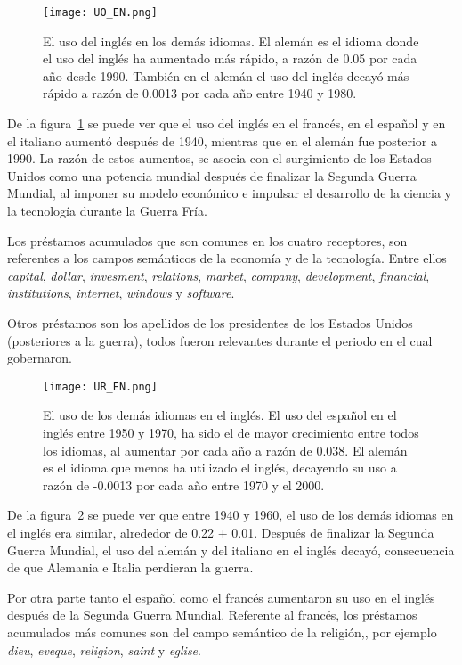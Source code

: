 \begin{figure}[h!]
	\centering
	\texttt{[image: UO\_EN.png]}
	\caption{El uso del inglés en los demás idiomas. El alemán es el idioma donde el uso del inglés ha aumentado más rápido, a razón de  0.05 por cada año desde 1990. También en el alemán el uso del inglés decayó más rápido a razón de 0.0013 por cada año entre 1940 y 1980.}
	\label{fig.UO_EN}
\end{figure} 


De la figura~\ref{fig.UO_EN} se puede ver que el uso del inglés en el francés, en el español y en el italiano aumentó después de 1940, mientras que en el alemán fue posterior a 1990.  La razón de estos aumentos, se asocia con el surgimiento de los Estados Unidos como una potencia mundial después de finalizar la Segunda Guerra Mundial,  al  imponer  su modelo económico e impulsar el desarrollo de la ciencia y la tecnología durante la Guerra Fría.

Los préstamos acumulados  que son comunes en los cuatro receptores, son referentes a los campos semánticos de la economía y de la tecnología. Entre ellos \textit{capital}, \textit{dollar}, \textit{invesment}, \textit{relations}, \textit{market}, \textit{company}, \textit{development}, \textit{financial},  \textit{institutions}, \textit{internet}, \textit{windows} y \textit{software}. 

Otros préstamos son los apellidos de los presidentes de los Estados Unidos (posteriores a la guerra), todos fueron relevantes durante el periodo en el cual gobernaron. 


\begin{figure}[h!]
	\centering
	\texttt{[image: UR\_EN.png]}
	\caption{El uso de los demás idiomas en el inglés. El uso del español en el inglés entre 1950 y 1970, ha sido el de mayor crecimiento entre todos los idiomas, al aumentar por cada año a razón de 0.038.  El alemán es el idioma que menos ha utilizado el inglés, decayendo su uso a razón de -0.0013 por cada año entre 1970 y el 2000.}
	\label{fig.UR_EN}
\end{figure} 


De la figura~\ref{fig.UR_EN} se puede ver que entre 1940 y 1960, el uso de los demás idiomas en el inglés era similar, alrededor de 0.22 $\pm$ 0.01. Después de finalizar la Segunda Guerra Mundial, el uso del alemán y del italiano en el inglés decayó,  consecuencia de que Alemania e Italia perdieran la guerra.

Por otra parte tanto el español como el francés aumentaron su uso en el inglés después de la Segunda Guerra Mundial. Referente al francés, los préstamos acumulados más comunes son del campo semántico de la religión,, por ejemplo \textit{dieu}, \textit{eveque}, \textit{religion}, \textit{saint} y \textit{eglise}.

